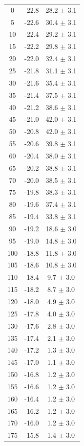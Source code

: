 \documentclass[a4paper,12pt]{article}
\begin{document}
\begin{center}
\begin{longtable}{|c|c|c|}
0 & -22.8 & 28.2 $\pm$  3.1 \\ 
5 & -22.6 & 30.4 $\pm$  3.1 \\ 
10 & -22.4 & 29.2 $\pm$  3.1 \\ 
15 & -22.2 & 29.8 $\pm$  3.1 \\ 
20 & -22.0 & 32.4 $\pm$  3.1 \\ 
25 & -21.8 & 31.1 $\pm$  3.1 \\ 
30 & -21.6 & 35.4 $\pm$  3.1 \\ 
35 & -21.4 & 37.5 $\pm$  3.1 \\ 
40 & -21.2 & 38.6 $\pm$  3.1 \\ 
45 & -21.0 & 42.0 $\pm$  3.1 \\ 
50 & -20.8 & 42.0 $\pm$  3.1 \\ 
55 & -20.6 & 39.8 $\pm$  3.1 \\ 
60 & -20.4 & 38.0 $\pm$  3.1 \\ 
65 & -20.2 & 38.8 $\pm$  3.1 \\ 
70 & -20.0 & 38.5 $\pm$  3.1 \\ 
75 & -19.8 & 38.3 $\pm$  3.1 \\ 
80 & -19.6 & 37.4 $\pm$  3.1 \\ 
85 & -19.4 & 33.8 $\pm$  3.1 \\ 
90 & -19.2 & 18.6 $\pm$  3.0 \\ 
95 & -19.0 & 14.8 $\pm$  3.0 \\ 
100 & -18.8 & 11.8 $\pm$  3.0 \\ 
105 & -18.6 & 10.8 $\pm$  3.0 \\ 
110 & -18.4 & 9.7 $\pm$  3.0 \\ 
115 & -18.2 & 8.7 $\pm$  3.0 \\ 
120 & -18.0 & 4.9 $\pm$  3.0 \\ 
125 & -17.8 & 4.0 $\pm$  3.0 \\ 
130 & -17.6 & 2.8 $\pm$  3.0 \\ 
135 & -17.4 & 2.1 $\pm$  3.0 \\ 
140 & -17.2 & 1.3 $\pm$  3.0 \\ 
145 & -17.0 & 1.1 $\pm$  3.0 \\ 
150 & -16.8 & 1.2 $\pm$  3.0 \\ 
155 & -16.6 & 1.2 $\pm$  3.0 \\ 
160 & -16.4 & 1.2 $\pm$  3.0 \\ 
165 & -16.2 & 1.2 $\pm$  3.0 \\ 
170 & -16.0 & 1.2 $\pm$  3.0 \\ 
175 & -15.8 & 1.4 $\pm$  3.0 \\ 

\end{longtable}
\end{center}
\end{document}
